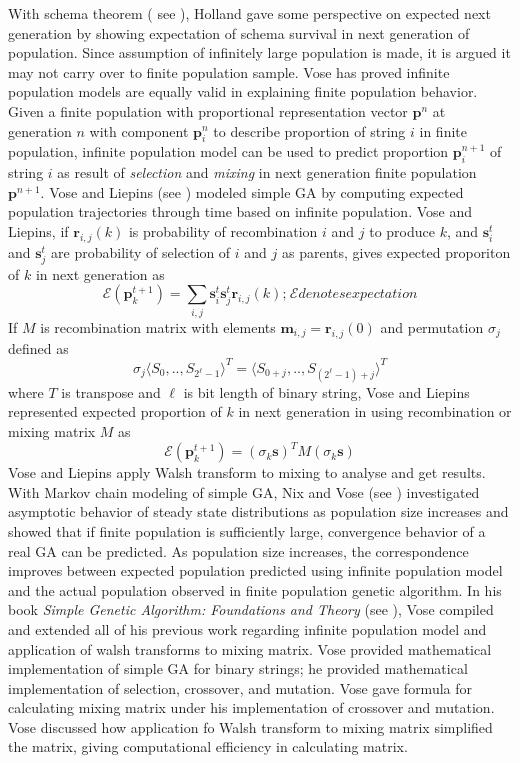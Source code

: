 With schema theorem ( see \cite{Holland1975}), Holland gave some perspective on expected next generation by showing expectation of schema survival in next generation of population. Since assumption of infinitely large population is made, it is argued it may not carry over to finite population sample. Vose has proved infinite population models are equally valid in explaining finite population behavior. 
Given a finite population with proportional representation vector $\bm{p}^n$ at generation $n$ with 
component $\bm{p}_i^n$ to describe proportion of string $i$ in finite population, infinite population model 
can be used to predict proportion $\bm{p}_i^{n+1}$ of string $i$ as result of \textit{selection} and 
\textit{mixing} in next generation finite population $\bm{p}^{n+1}$. Vose and Liepins (see \cite{VoseLiepins1991}) 
modeled simple GA by computing expected population trajectories through time based on infinite population. 
Vose and Liepins, if $\bm{r}_{i,j}(k)$ is probability of recombination $i$ and $j$ to produce $k$, and $\bm{s}_i^t$ and $\bm{s}_j^t$ 
are probability of selection of $i$ and $j$ as parents, gives expected proporiton of $k$ in next generation as
\[
\mathcal{E}(\bm{p}_k^{t+1}) = \sum_{i,j} \bm{s}_i^t \bm{s}_j^t \bm{r}_{i,j}(k) ; \hspace{1pt} \mathcal{E} denotes expectation
\]
If $M$ is recombination matrix with elements $\bm{m}_{i,j} = \bm{r}_{i,j}(0)$ and permutation $\sigma_j$ defined as 
\[
\sigma_j{\langle S_0,..,S_{2^\ell - 1} \rangle}^{T} = {\langle S_{0+j},..,S_{(2^\ell - 1)+j} \rangle}^{T}
\]
where $T$ is transpose and $\ell$ is bit length of binary string, Vose and Liepins represented expected proportion 
of $k$ in next generation in using recombination or mixing matrix $M$ as
\[
\mathcal{E}(\bm{p}_k^{t+1}) = (\sigma_k \bm{s})^T M (\sigma_k \bm{s})
\]
Vose and Liepins apply Walsh transform to mixing to analyse and get results. 
With Markov chain modeling of simple GA, Nix and Vose (see \cite{Nix1992}) investigated asymptotic behavior of steady 
state distributions as population size increases and showed that if finite population is sufficiently large, 
convergence behavior of a real GA can be predicted. As population size increases, the correspondence improves 
between expected population predicted using infinite population model and the actual population observed in 
finite population genetic algorithm. In his book \textit{Simple Genetic Algorithm: Foundations and Theory} (see \cite{Vose1999}), Vose compiled and extended all of his previous work regarding infinite population model and application of walsh transforms to mixing matrix. Vose provided mathematical implementation of simple GA for binary strings; he provided mathematical implementation of selection, crossover, and mutation. Vose gave formula for calculating mixing matrix under his implementation of crossover and mutation. Vose discussed how application fo Walsh transform to mixing matrix simplified the matrix, giving computational efficiency in calculating matrix.

